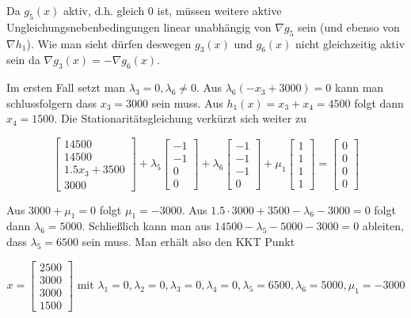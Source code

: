 \documentclass[a4paper, 12pt]{report}
\begin{document}
Da $g_5(x)$ aktiv, d.h. gleich $0$ ist, müssen weitere aktive Ungleichungsnebenbedingungen linear unabhängig von $\nabla g_5$ sein (und ebenso von $\nabla h_1$).
Wie man sieht dürfen deswegen $g_3(x)$ und $g_6(x)$ nicht gleichzeitig aktiv sein da $\nabla g_3(x) = -\nabla g_6(x)$.\par



Im ersten Fall setzt man $\lambda_3 = 0, \lambda_6 \neq 0$. Aus $\lambda_6(-x_3 + 3000) = 0$ kann man schlussfolgern dass $x_3 = 3000$
sein muss. Aus $h_1(x) = x_3 + x_4 = 4500$ folgt dann $x_4 = 1500$. Die Stationaritätsgleichung verkürzt sich weiter zu

$$ \begin{bmatrix}14500\\14500\\1.5x_3 + 3500\\3000\end{bmatrix} + \lambda_5 \begin{bmatrix}-1\\-1\\0\\0\end{bmatrix} + \lambda_6 \begin{bmatrix} -1\\-1\\-1\\0 \end{bmatrix} + \mu_1 \begin{bmatrix}1\\1\\1\\1\end{bmatrix} = \begin{bmatrix}0\\0\\0\\0\end{bmatrix} $$

Aus $3000 + \mu_1 = 0$ folgt $\mu_1 = -3000$. Aus $1.5 \cdot 3000 + 3500 - \lambda_6 - 3000 = 0$ folgt dann $\lambda_6 = 5000$.
Schließlich kann man aus $14500 - \lambda_5 - 5000 - 3000 = 0$ ableiten, dass $\lambda_5 = 6500$ sein muss. Man erhält also
den KKT Punkt

$$ x = \begin{bmatrix}2500\\3000\\3000\\1500\end{bmatrix} \text{ mit } \lambda_1 = 0, \lambda_2 = 0, \lambda_3 = 0, \lambda_4 = 0, \lambda_5 = 6500, \lambda_6 = 5000, \mu_1 = -3000$$
\end{document}
